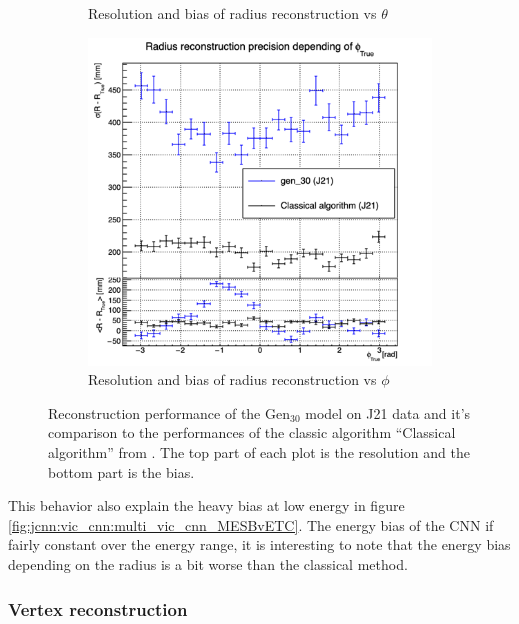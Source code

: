 \documentclass[../main.tex]{subfiles}
\begin{document}
\begin{figure}[ht]
\begin{subfigure}[t]{0.32\linewidth}
    \caption{Resolution and bias of radius reconstruction vs $\theta$}
    \label{fig:jcnn:vic_cnn:multi_vic_cnn_MSBvTTC}
  \end{subfigure}
  \begin{subfigure}[t]{0.32\linewidth}
    \centering
    \includegraphics[width=\linewidth]{images/jcnn/vic_cnn/multi_vic_cnn_MSBvPTC.png}
    \caption{Resolution and bias of radius reconstruction vs $\phi$}
    \label{fig:jcnn:vic_cnn:multi_vic_cnn_MSBvPTC}
  \end{subfigure}
  \caption{Reconstruction performance of the $\mathrm{Gen}_{30}$ model on J21 data and it's comparison to the performances of the classic algorithm ``Classical algorithm'' from \cite{lebrin_towards_2022}. The top part of each plot is the resolution and the bottom part is the bias.}
  \label{fig:jcnn:vic_cnn}
\end{figure}

This behavior also explain the heavy bias at low energy in figure \ref{fig:jcnn:vic_cnn:multi_vic_cnn_MESBvETC}. The energy bias of the CNN if fairly constant over the energy range, it is interesting to note that the energy bias depending on the radius is a bit worse than the classical method.

\subsubsection{Vertex reconstruction}
\end{document}

